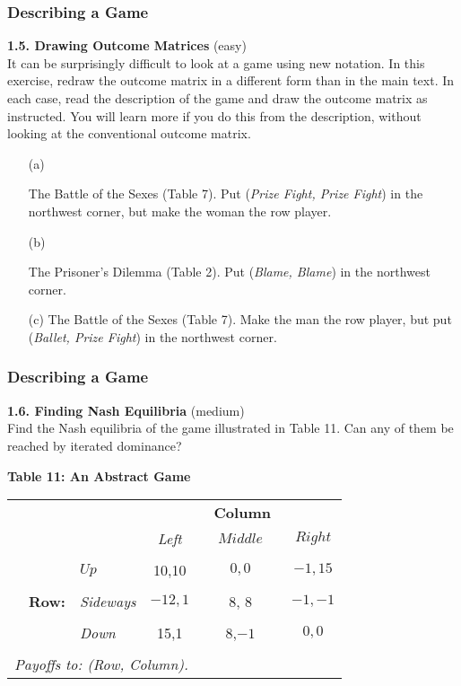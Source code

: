  \begin{frame}[fragile]\frametitle{Describing a Game}

 {\bf 1.5. Drawing Outcome Matrices  } (easy)  \\ It can be
surprisingly difficult to look at a game using  new notation.  In this
exercise, redraw the outcome matrix in a different form than   in the  main
text. In each case, read the description of the game and draw the outcome matrix
as instructed. You will learn more if you do this from the description, without
looking at the conventional outcome matrix.

 \begin{enumerate}

 \item[(a)]

  The {  Battle of the Sexes}  (Table  7). Put ({\it Prize Fight, Prize Fight})
in the northwest corner, but make the woman the row player.

  \item[(b)]

 The  { Prisoner's Dilemma} (Table  2). Put ({\it Blame, Blame}) in the
northwest  corner.

 \item[(c)] The  {  Battle of the Sexes}  (Table  7). Make the man the row
player, but put ({\it Ballet, Prize Fight}) in the northwest corner.

 \end{enumerate}

\end{frame}
 \begin{frame}[fragile]\frametitle{Describing a Game}
 
   {\bf 1.6.  Finding Nash Equilibria} (medium)\\ Find the Nash
equilibria of the   game illustrated in Table   11. Can any of them be reached
by   iterated dominance?

   \begin{center} {\bf Table  11:   An Abstract Game  }

 \begin{tabular}{lllccccc} &       &             &\multicolumn{5}{c}{\bf Column}
\\ &       &   &  {\it  Left }   &   &  $Middle$   & &$Right$   \\ &   && & &  &
\\ &   &  $ Up$       &  10,10 &    &  $0,0$&  & $-1, 15$\\ &  && & &  & \\ &
{\bf Row:} &    {\it Sideways }    &    $   -12,1$  &    & {   8, 8} & & $-1,-1$
\\ &   && & &  & \\ &  &    {\it Down }    &     {   15,1}  &    & 8,$-1$  & & $
0,0$ \\ &   && & &  & \\ \multicolumn{8}{l}{\it Payoffs to: (Row, Column).}
\end{tabular} \end{center}

\end{frame}
